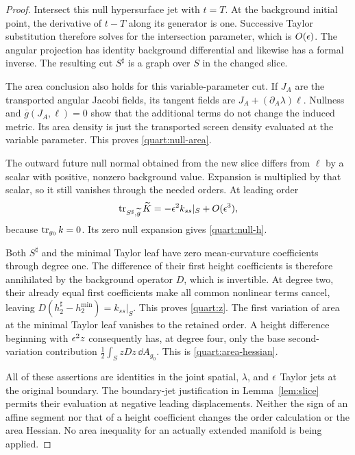 \begin{proof}
Intersect this null hypersurface jet with \(t=T\).  At the background
initial point, the derivative of \(t-T\) along its generator is one.
Successive Taylor substitution therefore solves for the intersection
parameter, which is \(O(\epsilon)\).  The angular projection has identity
background differential and likewise has a formal inverse.  The
resulting cut \(S^\sharp\) is a graph over \(S\) in the changed
slice.

The area conclusion also holds for this variable-parameter cut.  If
\(J_A\) are the transported angular Jacobi fields, its tangent fields
are \(J_A+(\partial_A\lambda)\ell\).  Nullness and
\(\overline g(J_A,\ell)=0\) show that the additional terms do not
change the induced metric.  Its area density is just the transported
screen density evaluated at the variable parameter.  This proves
\eqref{quart:null-area}.

The outward future null normal obtained from the new slice differs
from \(\ell\) by a scalar with positive, nonzero background value.
Expansion is multiplied by that scalar, so it still vanishes through
the needed orders.  At leading order
\[
 \operatorname{tr}_{S^\sharp,\widetilde g}\widetilde K
       =-\epsilon^2k_{ss}|_S+O(\epsilon^3),
\]
because \(\operatorname{tr}_{g_0}k=0\).  Its zero null expansion gives
\eqref{quart:null-h}.

Both \(S^\sharp\) and the minimal Taylor leaf have zero mean-curvature
coefficients through degree one.  The difference of their first height
coefficients is therefore annihilated by the background operator
\(D\), which is invertible.  At degree two, their already equal first
coefficients make all common nonlinear terms cancel, leaving
\(D(h_2^\sharp-h_2^{\min})=k_{ss}|_S\).  This proves
\eqref{quart:z}.  The first variation of area at the minimal Taylor
leaf vanishes to the retained order.  A height difference beginning
with \(\epsilon^2z\) consequently has, at degree four, only the base
second-variation contribution
\(\frac12\int_S zDz\,\dd A_{g_0}\).  This is
\eqref{quart:area-hessian}.

All of these assertions are identities in the joint spatial,
\(\lambda\), and \(\epsilon\) Taylor jets at the original boundary.
The boundary-jet justification in Lemma~\ref{lem:slice} permits their
evaluation at negative leading displacements.  Neither the sign of an
affine segment nor that of a height coefficient changes the order
calculation or the area Hessian.  No area inequality for an actually
extended manifold is being applied.
\end{proof}

